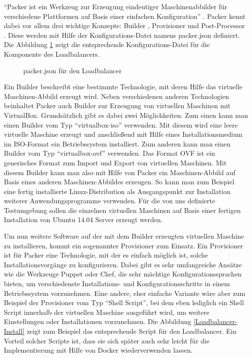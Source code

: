 "`Packer ist ein Werkzeug zur Erzeugung eindeutiger Maschinenabbilder für verschiedene Plattformen auf Basis einer einfachen Konfiguration"' \citep[Siehe][]{Packer15}. Packer kennt dabei vor allem drei wichtige Konzepte: Builder \citep[Vgl.][]{Packer:001}, Provisioner \citep[Vgl.][]{Packer:002} und Post-Processor \citep[Vgl.][]{Packer:003}. Diese werden mit Hilfe der Konfigurations-Datei namens packer.json definiert. Die Abbildung \ref{Loadbalancer-Packer} zeigt die entsprechende Konfigurations-Datei für die Komponente des Loadbalancers.

\begin{figure}[!ht]
  \begin{center}
    \caption{packer.json für den Loadbalancer}
    \label{Loadbalancer-Packer}
  \end{center}
\end{figure}

Ein Builder \citep[Vgl.][]{Packer:001} beschreibt eine bestimmte Technologie, mit deren Hilfe das virtuelle Maschinen-Abbild erzeugt wird. Neben verschiedenen anderen Technologien beinhaltet Packer auch Builder zur Erzeugung von virtuellen Maschinen mit VirtualBox. Grundsätzlich gibt es dabei zwei Möglichkeiten: Zum einen kann man einen Builder vom Typ "`virtualbox-iso"' verwenden. Mit diesem wird eine leere virtuelle Maschine erzeugt und anschließend mit Hilfe eines Installationsmedium im ISO-Format ein Betriebssystem installiert. Zum anderen kann man einen Builder vom Typ "`virtualbox-ovf"' verwenden. Das Format OVF ist ein generisches Format zum Import und Export von virtuellen Maschinen. Mit diesem Builder kann man also mit Hilfe von Packer ein Maschinen-Abbild auf Basis eines anderen Maschinen-Abbildes erzeugen. So kann man zum Beispiel eine fertig installierte Linux-Distribution als Ausgangspunkt zur Installation weiterer Anwendungsprogramme verwenden. Für die von uns definierte Testumgebung sollen die einzelnen virtuellen Maschinen auf Basis einer fertigen Installation von Ubuntu 14.04 Server erzeugt werden.

Um nun weitere Software auf der mit dem Builder erzeugten virtuellen Maschine zu installieren, kommt ein sogenannter Provisioner \citep[Vgl.][]{Packer:002} zum Einsatz. Ein Provisioner ist für Packer eine Technologie, mit der es einfach möglich ist, solche Installationsvorgänge zu konfigurieren. Dabei gibt es sehr umfangreiche Ansätze wie die Werkzeuge Puppet oder Chef, die sehr mächtige Konfigurationssprachen bieten, um verschiedenste Installations- und Konfigurationsschritte in einem Betriebssystem vorzunehmen. Eine andere, eher einfache Variante wäre aber zum Beispiel der Provisioner vom Typ "`Shell Script"', bei dem eben lediglich ein Shell Script innerhalb der virtuellen Maschine ausgeführt wird, um weitere Einstellungen oder Installationen vorzunehmen. Die Abbildung \ref{Loadbalancer-Install} zeigt zum Beispiel das entsprechende Script für den Loadbalancer. Ein Vorteil solcher Scripte ist, dass sie sich später auch sehr leicht für die Implementierung mit Hilfe von Docker wiederverwenden lassen.

